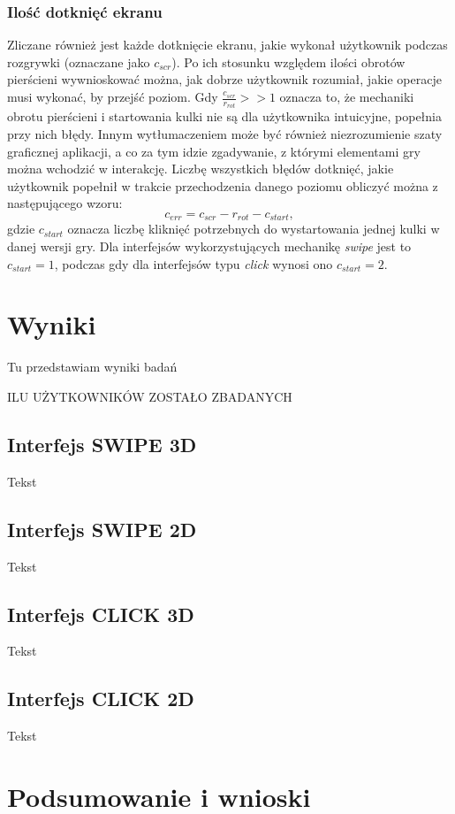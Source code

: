 \documentclass[a4paper,12pt,numbers=noenddot]{report}
\begin{document}
	\subsection{Ilość dotknięć ekranu}
Zliczane również jest każde dotknięcie ekranu, jakie wykonał użytkownik podczas rozgrywki (oznaczane jako $c_{scr}$). Po ich stosunku względem ilości obrotów pierścieni wywnioskować można, jak dobrze użytkownik rozumiał, jakie operacje musi wykonać, by przejść poziom. Gdy $\frac{c_{scr}}{r_{rot}} >> 1$ oznacza to, że mechaniki obrotu pierścieni i startowania kulki nie są dla użytkownika intuicyjne, popełnia przy nich błędy. Innym wytłumaczeniem może być również niezrozumienie szaty graficznej aplikacji, a co za tym idzie zgadywanie, z którymi elementami gry można wchodzić w interakcję. Liczbę wszystkich błędów dotknięć, jakie użytkownik popełnił w trakcie przechodzenia danego poziomu obliczyć można z następującego wzoru:
\begin{equation}
c_{err} = c_{scr} - r_{rot} - c_{start},
\end{equation}
gdzie  $c_{start}$ oznacza liczbę kliknięć potrzebnych do wystartowania jednej kulki w danej wersji gry. Dla interfejsów wykorzystujących mechanikę \textit{swipe} jest to $c_{start} = 1$, podczas gdy dla interfejsów typu \textit{click} wynosi ono $c_{start} = 2$.
\chapter{Wyniki}
Tu przedstawiam wyniki badań

ILU UŻYTKOWNIKÓW ZOSTAŁO ZBADANYCH


\section{Interfejs SWIPE 3D}
Tekst
\section{Interfejs SWIPE 2D}
Tekst
\section{Interfejs CLICK 3D}
Tekst
\section{Interfejs CLICK 2D}
Tekst
\chapter{Podsumowanie i wnioski}
\end{document}
